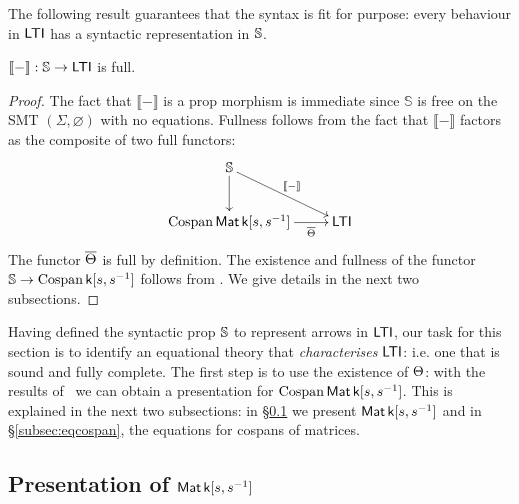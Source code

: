 The following result guarantees that the syntax is fit for purpose: every
behaviour in $\operatorname{\mathsf{LTI}}$ has a syntactic representation in $\mathbb{S}$.
\begin{proposition}\label{prop.syntaxfull}
  $\llbracket - \rrbracket: \mathbb{S}\to\operatorname{\mathsf{LTI}}$ is full.
\end{proposition}
\begin{proof}
  The fact that $\llbracket - \rrbracket$ is a prop morphism is immediate since
  $\mathbb{S}$ is free on the SMT $(\Sigma,\varnothing)$ with no
  equations.  Fullness follows from the fact that $\llbracket - \rrbracket$
  factors as the composite of two full functors:
  \[
    \xymatrixrowsep{2pc}
    \xymatrix{
      \syntax \ar[d] \ar[dr]^{\llbracket-\rrbracket} \\
      \cospan\mat\pk \ar[r]_-{\cospanfunrest} & \ltids
    }
  \]
  The functor $\overline{\Theta}$ is full by definition. The existence and fullness
  of the functor $\mathbb{S}\to\operatorname{{Cospan}}{\mathsf{k}[s,s^{-1}]}$ follows from \cite[Theorem 3.41]{Za}. We
  give details in the next two subsections.
\end{proof}

Having defined the syntactic prop $\mathbb{S}$ to represent arrows in $\operatorname{\mathsf{LTI}}$, our
task for this section is to identify an equational theory that
\emph{characterises} $\operatorname{\mathsf{LTI}}$: i.e. one that is sound and fully complete. The
first step is to use the existence of $\Theta$: with the results
of~\cite{BSZ2,Za} we can obtain a presentation for $\operatorname{{Cospan}}\operatorname{\mathsf{Mat}}{\mathsf{k}[s,s^{-1}]}$. This is
explained in the next two subsections: in \S\ref{subsec:eqhopf} we present
$\operatorname{\mathsf{Mat}}{\mathsf{k}[s,s^{-1}]}$ and in \S\ref{subsec:eqcospan}, the equations for cospans of matrices.


\subsection{Presentation of $\operatorname{\mathsf{Mat}}{\mathsf{k}[s,s^{-1}]}$}\label{subsec:eqhopf}


